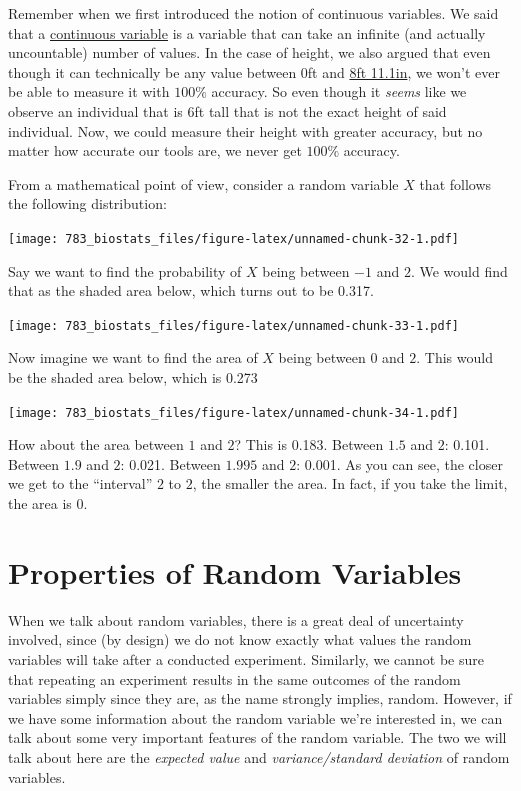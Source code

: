 \documentclass[]{book}
\theoremstyle{definition}
\theoremstyle{definition}
\theoremstyle{definition}
\theoremstyle{remark}
\begin{document}
Remember when we first introduced the notion of continuous variables. We said that a \protect\hyperlink{continuous}{continuous variable} is a variable that can take an infinite (and actually uncountable) number of values. In the case of height, we also argued that even though it can technically be any value between 0ft and \href{https://www.guinnessworldrecords.com/world-records/tallest-man-ever}{8ft 11.1in}, we won't ever be able to measure it with \(100\%\) accuracy. So even though it \emph{seems} like we observe an individual that is 6ft tall that is not the exact height of said individual. Now, we could measure their height with greater accuracy, but no matter how accurate our tools are, we never get \(100\%\) accuracy.

From a mathematical point of view, consider a random variable \(X\) that follows the following distribution:

\texttt{[image: 783\_biostats\_files/figure-latex/unnamed-chunk-32-1.pdf]}

Say we want to find the probability of \(X\) being between \(-1\) and \(2\). We would find that as the shaded area below, which turns out to be 0.317.

\texttt{[image: 783\_biostats\_files/figure-latex/unnamed-chunk-33-1.pdf]}

Now imagine we want to find the area of \(X\) being between \(0\) and \(2\). This would be the shaded area below, which is 0.273

\texttt{[image: 783\_biostats\_files/figure-latex/unnamed-chunk-34-1.pdf]}

How about the area between \(1\) and \(2\)? This is 0.183. Between \(1.5\) and \(2\): 0.101. Between \(1.9\) and \(2\): 0.021. Between \(1.995\) and \(2\): 0.001. As you can see, the closer we get to the ``interval'' \(2\) to \(2\), the smaller the area. In fact, if you take the limit, the area is \(0\).

\hypertarget{prop-of-RVs}{%
\section{Properties of Random Variables}\label{prop-of-RVs}}

When we talk about random variables, there is a great deal of uncertainty involved, since (by design) we do not know exactly what values the random variables will take after a conducted experiment. Similarly, we cannot be sure that repeating an experiment results in the same outcomes of the random variables simply since they are, as the name strongly implies, random. However, if we have some information about the random variable we're interested in, we can talk about some very important features of the random variable. The two we will talk about here are the \emph{expected value} and \emph{variance/standard deviation} of random variables.
\end{document}
